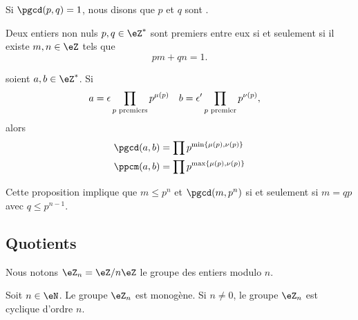 Si \( \pgcd(p,q)=1\), nous disons que \( p\) et \( q\) sont .

\begin{theorem}
    Deux entiers non nuls \( p,q\in\eZ^*\) sont premiers entre eux si et seulement si il existe \( m,n\in\eZ\) tels que 
    \begin{equation}
        pm+qn=1.
    \end{equation}
\end{theorem}

\begin{proposition}
    soient \( a,b\in\eZ^*\). Si
    \begin{equation}
        \begin{aligned}[]
            a&=\epsilon\prod_{\text{\( p\) premiers}}p^{\mu(p)}&b&=\epsilon'\prod_{\text{\( p\) premier}}p^{\nu(p)},
        \end{aligned}
    \end{equation}
    alors
    \begin{subequations}
        \begin{align}
            \pgcd(a,b)&=\prod p^{\min\{ \mu(p),\nu(p) \}}\\
            \ppcm(a,b)&=\prod p^{\max\{ \mu(p),\nu(p) \}}
        \end{align}
    \end{subequations}    
\end{proposition}

Cette proposition implique que \( m\leq p^n\) et \( \pgcd(m,p^n)\) si et seulement si \( m=qp\) avec \( q\leq p^{n-1}\).

\subsection{Quotients}

Nous notons \( \eZ_n=\eZ/n\eZ\) le groupe des entiers modulo \( n\).

\begin{proposition}
    Soit \( n\in\eN\). Le groupe \( \eZ_n\) est monogène. Si \( n\neq 0\), le groupe \( \eZ_n\) est cyclique d'ordre \( n\).
\end{proposition}

